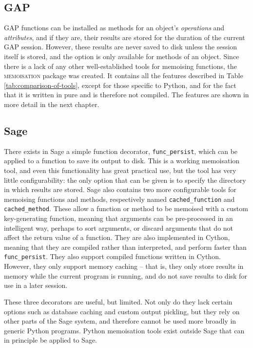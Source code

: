 \documentclass{deliverablereport}
\newcommand{\Memoisation}{\textsc{memoisation}}
\begin{document}
\subsection{GAP}
GAP functions can be installed as methods for an object's
\emph{operations} and \emph{attributes}, and if they are, their results are
stored for the duration of the current GAP session.  However, these results are
never saved to disk unless the session itself is stored, and the option is only
available for methods of an object.  Since there is a lack of any other
well-established tools for memoising functions, the \Memoisation{} package was
created.  It contains all the features described in Table
\ref{tab:comparison-of-tools}, except for those specific to Python, and for the
fact that it is written in pure \GAP and is therefore not compiled.  The
features are shown in more detail in the next chapter.

\subsection{Sage}
There exists in Sage a simple function decorator, \texttt{func\_persist}, which
can be applied to a function to save its output to disk.  This is a working
memoisation tool, and even this functionality has great practical use, but the
tool has very little configurability: the only option that can be given is to
specify the directory in which results are stored.  Sage also contains two more
configurable tools for memoising functions and methods, respectively named
\texttt{cached\_function} and \texttt{cached\_method}.  These allow a function
or method to be memoised with a custom key-generating function, meaning that
arguments can be pre-processed in an intelligent way, perhaps to sort arguments,
or discard arguments that do not affect the return value of a function.
They are also implemented in Cython, meaning that they are compiled
rather than interpreted, and perform
faster than \texttt{func\_persist}. They also support compiled functions written in
Cython.
However, they only support memory caching -- that is, they only store results in
memory while the current program is running, and do not save results to disk for
use in a later session.

These three decorators are useful, but limited.  Not only do they lack certain
options such as database caching and custom output pickling, but they rely on
other parts of the Sage system, and therefore cannot be used more broadly in
generic Python programs.  Python memoisation tools exist outside Sage that can
in principle be applied to Sage.
\end{document}
